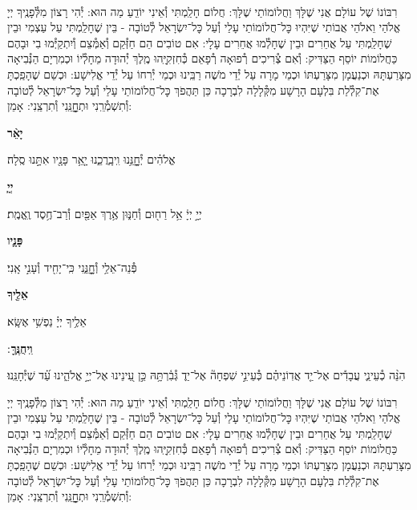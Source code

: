 \documentclass[twoside, openany, parskip=half, 11pt]{book}
\begin{document}
\\

רִבּוֹנוֹ שֶׁל עוֹלָם אֲנִי שֶׁלָּךְ וַחֲלוֹמוֹתַי שֶׁלָּךְ: חֲלוֹם חָלַֽמְתִּי וְ֯אֵינִי יוֹדֵֽעַ מַה הוּא: יְ֯הִי רָצוֹן מִלְּ֯פָנֶֽיךָ יְיָ אֱלֹהַי וֵאלֹהֵי אֲבוֹתַי שֶׁיִּהְיוּ כׇּל־חֲלוֹמוֹתַי עָלַי וְ֯עַל כׇּל־יִשְׂרָאֵל לְ֯טוֹבָה - בֵּין שֶׁחָלַֽמְתִּי עַל עַצְמִי וּבֵין שֶׁחָלַֽמְתִּי עַל אֲחֵרִים וּבֵין שֶׁחָלְ֯מוּ אֲחֵרִים עָלָי: אִם טוֹבִים הֵם חַזְּ֯קֵם וְ֯אַמְּ֯צֵם וְ֯יִתְקַיְּ֯מוּ בִי וּבָהֶם כַּחֲלוֹמוֹת יוֹסֵף הַצַּדִּיק: וְ֯אִם צְ֯רִיכִים רְ֯פוּאָה רְ֯פָאֵם כְּ֯חִזְקִיָּֽהוּ מֶֽלֶךְ יְ֯הוּדָה מֵחָלְ֯יוֹ וּכְמִרְיָם הַנְּ֯בִיאָה מִצָּרַעְתָּהּ וּכְנַעֲמָן מִצָּרַעְתּוֹ וּכְמֵי מָרָה עַל יְ֯דֵי מֹשֶׁה רַבֵּֽינוּ וּכְמֵי יְ֯רִחוֹ עַל יְ֯דֵי אֱלִישָׁע: וּכְשֵׁם שֶׁהָפַֽכְתָּ אֶת־קִלְ֯לַת בִּלְעָם הָרָשָׁע מִקְּ֯לָלָה לִבְרָכָה כֵּן תַּהֲפֹךְ כׇּל־חֲלוֹמוֹתַי עָלַי וְ֯עַל כׇּל־יִשְׂרָאֵל לְ֯טוֹבָה וְ֯תִשְׁמְ֯רֵֽנִי וּתְחׇׇׇׇׇנֵּֽנִי וְ֯תִרְצֵֽנִי: אָמֵן:



\textbf{יָאֵ֨ר}
\hfill \begin{footnotesize}
אֱלֹהִ֗ים יְ֯חׇׇׇׇנֵּ֥נוּ וִֽיבָֽרֲכֵ֑נוּ יָ֤אֵ֥ר פָּנָ֖יו אִתָּ֣נוּ סֶֽלָה׃\\
\end{footnotesize}
\textbf{יְיָ֧}
\hfill \begin{footnotesize}
יְיָ֣ יְיָ֔ אֵ֥ל רַח֖וּם וְ֯חַנּ֑וּן אֶ֥רֶךְ אַפַּ֖יִם וְ֯רַב־חֶ֥סֶד וֶֽאֱמֶֽת׃\\
\end{footnotesize}
\textbf{פָּנָ֛יו}
\hfill \begin{footnotesize}
פְּ֯נֵה־אֵלַ֥י וְ֯חׇׇׇׇׇנֵּ֑נִי כִּֽי־יָחִ֖יד וְ֯עָנִ֣י אָֽנִי׃\\
\end{footnotesize}
\textbf{אֵלֶ֖יךָ}
\hfill \begin{footnotesize}
אֵלֶ֥יךָ יְיָ֗ נַפְשִׁ֥י אֶשָּֽׂא׃\\
\end{footnotesize}
\textbf{וִֽיחֻנֶּֽךָּ}
׃ \hfill \begin{footnotesize}
הִנֵּ֨ה כְ֯עֵינֵ֢י עֲבָדִ֡ים אֶל־יַ֤ד אֲדֽוֹנֵיהֶ֗ם כְּ֯עֵינֵ֣י שִׁפְחָה֘ אֶל־יַד֢ גְּ֯בִ֫רְתָּ֥הּ כֵּ֣ן עֵ֭ינֵינוּ אֶל־יְיָ֣ אֱלֹהֵ֑ינוּ עַ֝֗ד שֶׁיְּ֯חָנֵּֽנוּ׃
\end{footnotesize}


רִבּוֹנוֹ שֶׁל עוֹלָם אֲנִי שֶׁלָּךְ וַחֲלוֹמוֹתַי שֶׁלָּךְ: חֲלוֹם חָלַֽמְתִּי וְ֯אֵינִי יוֹדֵֽעַ מַה הוּא: יְ֯הִי רָצוֹן מִלְּ֯פָנֶֽיךָ יְיָ אֱלֹהַי וֵאלֹהֵי אֲבוֹתַי שֶׁיִּהְיוּ כׇּל־חֲלוֹמוֹתַי עָלַי וְ֯עַל כׇּל־יִשְׂרָאֵל לְ֯טוֹבָה - בֵּין שֶׁחָלַֽמְתִּי עַל עַצְמִי וּבֵין שֶׁחָלַֽמְתִּי עַל אֲחֵרִים וּבֵין שֶׁחָלְ֯מוּ אֲחֵרִים עָלָי: אִם טוֹבִים הֵם חַזְּ֯קֵם וְ֯אַמְּ֯צֵם וְ֯יִתְקַיְּ֯מוּ בִי וּבָהֶם כַּחֲלוֹמוֹת יוֹסֵף הַצַּדִּיק: וְ֯אִם צְ֯רִיכִים רְ֯פוּאָה רְ֯פָאֵם כְּ֯חִזְקִיָּֽהוּ מֶֽלֶךְ יְ֯הוּדָה מֵחָלְ֯יוֹ וּכְמִרְיָם הַנְּ֯בִיאָה מִצָּרַעְתָּהּ וּכְנַעֲמָן מִצָּרַעְתּוֹ וּכְמֵי מָרָה עַל יְ֯דֵי מֹשֶׁה רַבֵּֽינוּ וּכְמֵי יְ֯רִחוֹ עַל יְ֯דֵי אֱלִישָׁע: וּכְשֵׁם שֶׁהָפַֽכְתָּ אֶת־קִלְ֯לַת בִּלְעָם הָרָשָׁע מִקְּ֯לָלָה לִבְרָכָה כֵּן תַּהֲפֹךְ כׇּל־חֲלוֹמוֹתַי עָלַי וְ֯עַל כׇּל־יִשְׂרָאֵל לְ֯טוֹבָה וְ֯תִשְׁמְ֯רֵֽנִי וּתְחׇׇׇׇׇנֵּֽנִי וְ֯תִרְצֵֽנִי: אָמֵן:
\end{document}
